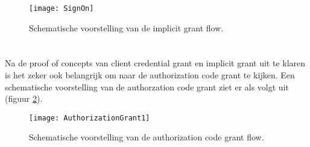 \begin{figure}[H]
	\centering
	\texttt{[image: SignOn]} 
	\caption[SignOn]{Schematische voorstelling van de implicit grant flow.}
	\label{fig:signOn}
	\scriptsize
	\cite{jmprieur2019}
\end{figure}
\section{}
\label{sec:authorizationCode}
Na de proof of concepts van client credential grant en implicit grant uit te klaren is het zeker ook belangrijk om naar de authorization code grant te kijken. Een schematische voorstelling van de authorzation code grant ziet er als volgt uit (figuur \ref{fig:authGrant1}).
\begin{figure}[H]
	\centering
	\texttt{[image: AuthorizationGrant1]} 
	\caption[AthorizationGrant1]{Schematische voorstelling van de authorization code grant flow.}
	\label{fig:authGrant1}
	\scriptsize
\end{figure}
